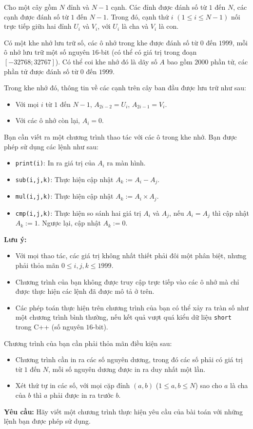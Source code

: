 Cho một cây gồm $N$ đỉnh và $N-1$ cạnh. Các đỉnh được đánh số từ $1$ đến $N$, các cạnh được đánh số từ $1$ đến $N-1$. Trong đó, cạnh thứ $i$ $(1 \le i \le N-1)$ nối trực tiếp giữa hai đỉnh $U_i$ và $V_i$, với $U_i$ là cha và $V_i$ là con.

Có một khe nhớ lưu trữ số, các ô nhớ trong khe được đánh số từ $0$ đến $1999$, mỗi ô nhớ lưu trữ một số nguyên $16$-bit (có thể có giá trị trong đoạn $[-32768;32767]$). Có thể coi khe nhớ đó là dãy số $A$ bao gồm $2000$ phần tử, các phần tử được đánh số từ $0$ đến $1999$.

Trong khe nhớ đó, thông tin về các cạnh trên cây ban đầu được lưu trữ như sau:
\begin{itemize}
    \item Với mọi $i$ từ $1$ đến $N-1$, $A_{2i-2} = U_i$, $A_{2i-1} = V_i$.
    \item Với các ô nhớ còn lại, $A_i = 0$.
\end{itemize}

Bạn cần viết ra một chương trình thao tác với các ô trong khe nhớ. Bạn được phép sử dụng các lệnh như sau:
\begin{itemize}
    \item \texttt{print(i)}: In ra giá trị của $A_i$ ra màn hình.
    \item \texttt{sub(i,j,k)}: Thực hiện cập nhật $A_k := A_i - A_j$.
    \item \texttt{mul(i,j,k)}: Thực hiện cập nhật $A_k := A_i \times A_j$.
    \item \texttt{cmp(i,j,k)}: Thực hiện so sánh hai giá trị $A_i$ và $A_j$, nếu $A_i = A_j$ thì cập nhật $A_k := 1$. Ngược lại, cập nhật $A_k := 0$.
\end{itemize}

\textbf{Lưu ý:}
\begin{itemize}
    \item Với mọi thao tác, các giá trị không nhất thiết phải đôi một phân biệt, nhưng phải thỏa mãn $0 \le i,j,k \le 1999$.
    \item Chương trình của bạn không được truy cập trực tiếp vào các ô nhớ mà chỉ được thực hiện các lệnh đã được mô tả ở trên.
    \item Các phép toán thực hiện trên chương trình của bạn có thể xảy ra tràn số như một chương trình bình thường, nếu kết quả vượt quá kiểu dữ liệu \texttt{short} trong C++ (số nguyên $16$-bit).
\end{itemize}

Chương trình của bạn cần phải thỏa mãn điều kiện sau:
\begin{itemize}
    \item Chương trình cần in ra các số nguyên dương, trong đó các số phải có giá trị từ $1$ đến $N$, mỗi số nguyên dương được in ra duy nhất một lần.
    \item Xét thứ tự in các số, với mọi cặp đỉnh $(a,b)$ ($1\le a,b\le N$) sao cho $a$ là cha của $b$ thì $a$ phải được in ra trước $b$.
\end{itemize}

\textbf{Yêu cầu:} Hãy viết một chương trình thực hiện yêu cầu của bài toán với những lệnh bạn được phép sử dụng.
